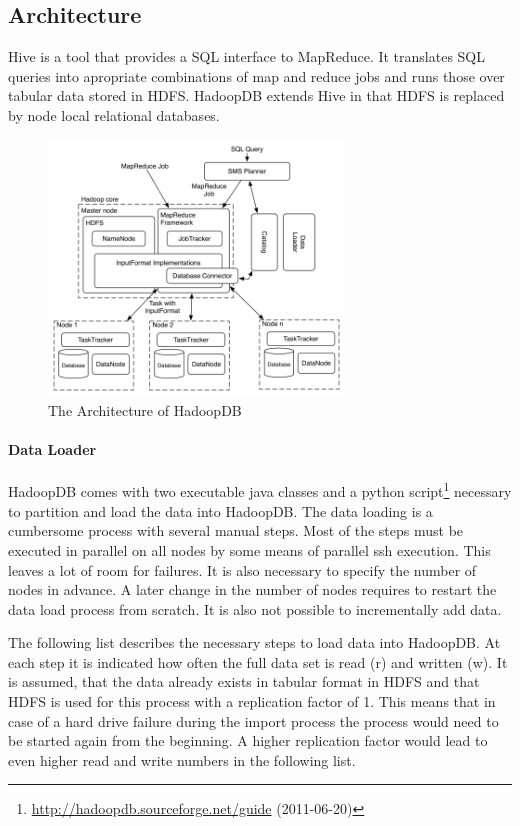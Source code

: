 \documentclass[12pt,a4paper]{scrartcl}		%
\newcommand{\citeurl}[2]{\url{#1} (#2)}
\begin{document}
\subsection{Architecture}
Hive is a tool that provides a SQL interface to MapReduce. It translates SQL queries into apropriate combinations of map and reduce jobs and runs those over tabular data stored in HDFS. HadoopDB extends Hive in that HDFS is replaced by node local relational databases.

\begin{figure}[t]
  \centering
  \includegraphics[width=0.7\textwidth]{images/hadoopdb-arch.png}
  \caption{The Architecture of HadoopDB\cite{journals/pvldb/AbouzeidBARS09}}
  \label{fig:hadoopdbarch}
\end{figure}

\paragraph{Data Loader}
HadoopDB comes with two executable java classes and a python script\footnote{\citeurl{http://hadoopdb.sourceforge.net/guide}{2011-06-20}} necessary to partition and load the data into HadoopDB. The data loading is a cumbersome process with several manual steps. Most of the steps must be executed in parallel on all nodes by some means of parallel ssh execution. This leaves a lot of room for failures. It is also necessary to specify the number of nodes in advance. A later change in the number of nodes requires to restart the data load process from scratch. It is also not possible to incrementally add data.

The following list describes the necessary steps to load data into HadoopDB. At each step it is indicated how often the full data set is read (r) and written (w). It is assumed, that the data already exists in tabular format in HDFS and that HDFS is used for this process with a replication factor of 1. This means that in case of a hard drive failure during the import process the process would need to be started again from the beginning. A higher replication factor would lead to even higher read and write numbers in the following list.
\end{document}
